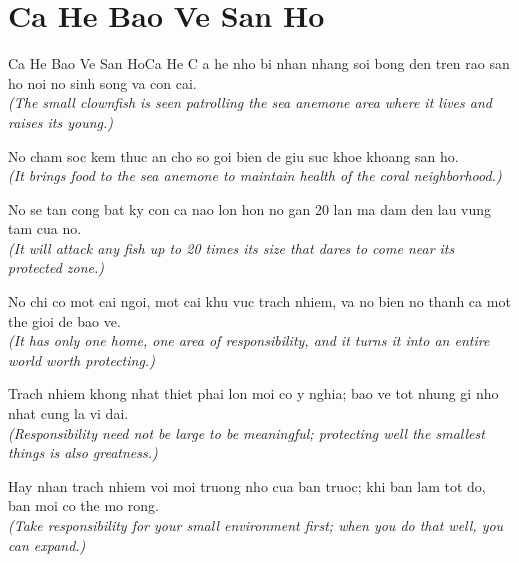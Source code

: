 \section{Ca He Bao Ve San Ho}
\begin{truyen}{Ca He Bao Ve San Ho}{Ca He}
C a he nho bi nhan nhang soi bong den tren rao san ho noi no sinh song va con cai.\\
\textit{(The small clownfish is seen patrolling the sea anemone area where it lives and raises its young.)}

No cham soc kem thuc an cho so goi bien de giu suc khoe khoang san ho.\\
\textit{(It brings food to the sea anemone to maintain health of the coral neighborhood.)}

No se tan cong bat ky con ca nao lon hon no gan 20 lan ma dam den lau vung tam cua no.\\
\textit{(It will attack any fish up to 20 times its size that dares to come near its protected zone.)}

No chi co mot cai ngoi, mot cai khu vuc trach nhiem, va no bien no thanh ca mot the gioi de bao ve.\\
\textit{(It has only one home, one area of responsibility, and it turns it into an entire world worth protecting.)}

Trach nhiem khong nhat thiet phai lon moi co y nghia; bao ve tot nhung gi nho nhat cung la vi dai.\\
\textit{(Responsibility need not be large to be meaningful; protecting well the smallest things is also greatness.)}

\end{truyen}
\begin{baihoc}
  Hay nhan trach nhiem voi moi truong nho cua ban truoc; khi ban lam tot do, ban moi co the mo rong.\\
  \textit{(Take responsibility for your small environment first; when you do that well, you can expand.)}
\end{baihoc}

